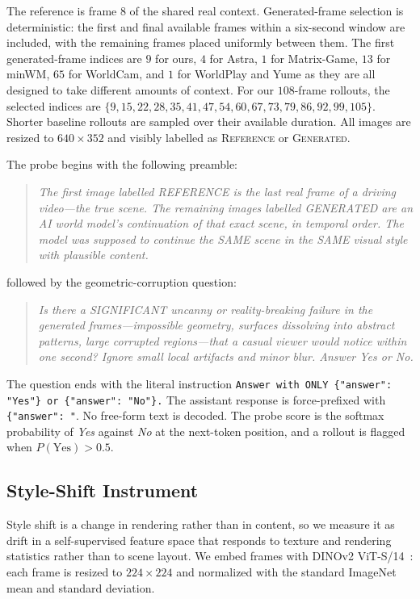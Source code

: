 \documentclass[letterpaper]{article} %
\begin{document}
The reference is frame $8$ of the shared real context. Generated-frame
selection is deterministic: the first and final available frames within a
six-second window are included, with the remaining frames placed uniformly
between them. The first
generated-frame indices are $9$ for ours, $4$ for Astra, $1$ for Matrix-Game,
$13$ for minWM, $65$ for WorldCam, and $1$ for WorldPlay and Yume as they are all designed to take different amounts of context. For our
$108$-frame rollouts, the selected indices are
$\{9,15,22,28,35,41,47,54,60,67,73,79,86,92,99,105\}$. Shorter baseline
rollouts are sampled over their available duration. All images are resized to
$640\times352$ and visibly labelled as \textsc{Reference} or
\textsc{Generated}.

The probe begins with the following preamble:

\begin{quote}
\small
\emph{The first image labelled REFERENCE is the last real frame of a driving
video---the true scene. The remaining images labelled GENERATED are an AI
world model's continuation of that exact scene, in temporal order. The model
was supposed to continue the SAME scene in the SAME visual style with
plausible content.}
\end{quote}

followed by the geometric-corruption question:

\begin{quote}
\small
\emph{Is there a SIGNIFICANT uncanny or reality-breaking failure in the
generated frames---impossible geometry, surfaces dissolving into abstract
patterns, large corrupted regions---that a casual viewer would notice within
one second? Ignore small local artifacts and minor blur. Answer Yes or No.}
\end{quote}

The question ends with the literal instruction
\texttt{Answer with ONLY \{"answer": "Yes"\} or \{"answer": "No"\}.}
The assistant response is force-prefixed with
\verb|{"answer": "|. No free-form text is decoded. The probe score is the
softmax probability of \emph{Yes} against \emph{No} at the next-token
position, and a rollout is flagged when $P(\mathrm{Yes})>0.5$.

\subsection{Style-Shift Instrument}
\label{app:style_instrument}

Style shift is a change in rendering rather than in content, so we measure it as
drift in a self-supervised feature space that responds to texture and rendering
statistics rather than to scene layout. We embed frames with
DINOv2 ViT-S/14~\cite{dinov2}: each frame is resized to $224\times224$ and
normalized with the standard ImageNet mean and standard deviation.
\end{document}
